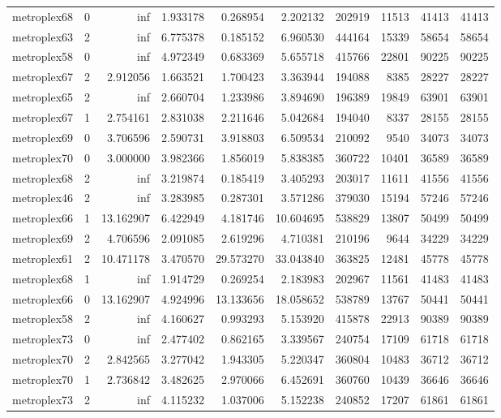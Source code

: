 \begin{longtable}{|l|r|r|r|r|r|r|r|r|r|}
metroplex68 & 0 & inf & 1.933178 & 0.268954 & 2.202132 & 202919 & 11513 & 41413 & 41413 \\
metroplex63 & 2 & inf & 6.775378 & 0.185152 & 6.960530 & 444164 & 15339 & 58654 & 58654 \\
metroplex58 & 0 & inf & 4.972349 & 0.683369 & 5.655718 & 415766 & 22801 & 90225 & 90225 \\
metroplex67 & 2 & 2.912056 & 1.663521 & 1.700423 & 3.363944 & 194088 & 8385 & 28227 & 28227 \\
metroplex65 & 2 & inf & 2.660704 & 1.233986 & 3.894690 & 196389 & 19849 & 63901 & 63901 \\
metroplex67 & 1 & 2.754161 & 2.831038 & 2.211646 & 5.042684 & 194040 & 8337 & 28155 & 28155 \\
metroplex69 & 0 & 3.706596 & 2.590731 & 3.918803 & 6.509534 & 210092 & 9540 & 34073 & 34073 \\
metroplex70 & 0 & 3.000000 & 3.982366 & 1.856019 & 5.838385 & 360722 & 10401 & 36589 & 36589 \\
metroplex68 & 2 & inf & 3.219874 & 0.185419 & 3.405293 & 203017 & 11611 & 41556 & 41556 \\
metroplex46 & 2 & inf & 3.283985 & 0.287301 & 3.571286 & 379030 & 15194 & 57246 & 57246 \\
metroplex66 & 1 & 13.162907 & 6.422949 & 4.181746 & 10.604695 & 538829 & 13807 & 50499 & 50499 \\
metroplex69 & 2 & 4.706596 & 2.091085 & 2.619296 & 4.710381 & 210196 & 9644 & 34229 & 34229 \\
metroplex61 & 2 & 10.471178 & 3.470570 & 29.573270 & 33.043840 & 363825 & 12481 & 45778 & 45778 \\
metroplex68 & 1 & inf & 1.914729 & 0.269254 & 2.183983 & 202967 & 11561 & 41483 & 41483 \\
metroplex66 & 0 & 13.162907 & 4.924996 & 13.133656 & 18.058652 & 538789 & 13767 & 50441 & 50441 \\
metroplex58 & 2 & inf & 4.160627 & 0.993293 & 5.153920 & 415878 & 22913 & 90389 & 90389 \\
metroplex73 & 0 & inf & 2.477402 & 0.862165 & 3.339567 & 240754 & 17109 & 61718 & 61718 \\
metroplex70 & 2 & 2.842565 & 3.277042 & 1.943305 & 5.220347 & 360804 & 10483 & 36712 & 36712 \\
metroplex70 & 1 & 2.736842 & 3.482625 & 2.970066 & 6.452691 & 360760 & 10439 & 36646 & 36646 \\
metroplex73 & 2 & inf & 4.115232 & 1.037006 & 5.152238 & 240852 & 17207 & 61861 & 61861 \\

\end{longtable}
